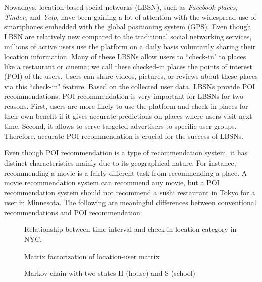 \documentclass{sig-alternate}
\begin{document}
Nowadays, location-based social networks (LBSN), such as \emph{Facebook places, Tinder},  and \emph{Yelp}, 
have been gaining a lot of attention with the widespread use of smartphones embedded with the 
global positioning system (GPS). Even though LBSN are relatively new compared to 
the traditional social networking services, millions of active users use the platform on a daily basis voluntarily sharing 
their location information. Many of these LBSNs allow users to ``check-in" to
places like a restaurant or cinema; we call these checked-in places the points of interest (POI) 
of the users. Users can share videos, pictures, or reviews about these places via this ``check-in" 
feature. Based on the collected user data, LBSNs provide POI recommendations. POI recommendation 
is very important for LBSNs for two reasons. First, users are more likely to use the platform and check-in places 
for their own benefit if it gives accurate predictions on places where users visit next time. 
Second, it allows to serve targeted advertisers to specific user groups. Therefore, 
accurate POI recommendation is crucial for the success of LBSNs. \cite{Cheng:2013}

Even though POI recommendation is a type of recommendation system, it has distinct characteristics 
mainly due to its geographical nature. For instance, recommending a movie is a fairly different task from 
recommending a place. A movie recommendation system can recommend any movie, but a POI recommendation 
system should not recommend a sushi restaurant in Tokyo for a user in Minnesota. The following are 
meaningful differences between conventional recommendations and POI recommendation:

\begin{figure}
\centering
{}
\caption{Relationship between time interval and check-in location category in NYC.}
\label{fig:NYC_checkIn}
\end{figure}

\begin{figure}
\centering
{}
\caption{Matrix factorization of location-user matrix}
\label{fig:MF}
\end{figure}

\begin{figure}
\centering
{}
\caption{Markov chain with two states H (house) and S (school)}
\label{fig:MarkovChain}
\end{figure}
\end{document}
